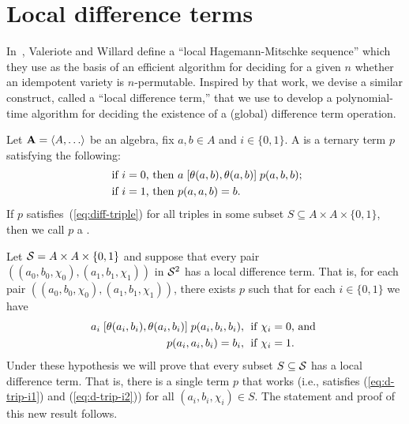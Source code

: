 \section{Local difference terms}

In~\cite{MR3239624},
Valeriote and Willard define %
a ``local Hagemann-Mitschke sequence'' which they use as the basis of
an efficient algorithm for deciding for a given $n$ whether an idempotent
variety is $n$-permutable. 
Inspired by that work, we devise a similar construct, called
a ``local difference term,'' that we use to develop a polynomial-time
algorithm for deciding the existence of a (global) difference term operation.



Let $\bA=\< A, \dots\>$ be an algebra, fix $a, b \in A$ and
$i \in \{0,1\}$.
A  is a ternary term $p$ satisfying the following:
\begin{align}
\text{ if $i=0$, then } & a \mathrel{[\theta(a,b), \theta(a,b)]} p(a,b,b); \label{eq:diff-triple}\\
\text{ if $i=1$, then } &p(a,a,b) = b. \nonumber
\end{align}
If $p$ satisfies~(\ref{eq:diff-triple}) for all triples
in some subset $S\subseteq A \times A \times \{0,1\}$, then we call $p$
a .

Let 
$\mathcal{S} = A \times A \times \{0,1\}$ and
suppose that every pair
$((a_0, b_0, \chi_0), (a_1, b_1, \chi_1))$
in $\mathcal{S}^2$ has a local difference term.
That is, for each pair $((a_0, b_0, \chi_0), (a_1, b_1, \chi_1))$, there exists
$p$ such that for each $i \in \{0,1\}$ we have
\begin{align}
  a_i \comm{\Cg(a_i,b_i)}{\Cg(a_i,b_i)} p(a_i,b_i,b_i), & \;
  \text{ if $\chi_i=0$, and }  \label{eq:d-trip-i1}\\
  p(a_i,a_i,b_i) =b_i, & \;
  \text{ if $\chi_i=1$.}\label{eq:d-trip-i2} %
\end{align}
Under these hypothesis we will prove that every subset $S\subseteq \mathcal{S}$
has a local difference term.
That is, there is a single term $p$ that works (i.e., satisfies
(\ref{eq:d-trip-i1}) and (\ref{eq:d-trip-i2})) for all $(a_i, b_i, \chi_i) \in S$.
The statement and proof of this new result follows.

